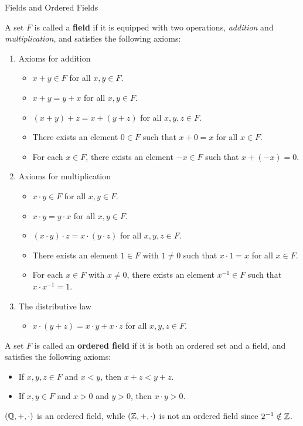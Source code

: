 \begin{section}{Fields and Ordered Fields}

A set $F$ is called a \textbf{field} if it is equipped with two operations,
\emph{addition} and \emph{multiplication}, and satisfies the following axioms:
\begin{enumerate}[label=\textbf{(\Alph*)}]
    \item Axioms for addition
    \begin{itemize}
        \item $x + y \in F$ for all $x, y \in F$.
        \item $x + y = y + x$ for all $x, y \in F$.
        \item $(x + y) + z = x + (y + z)$ for all $x, y, z \in F$.
        \item There exists an element $0 \in F$ such that $x + 0 = x$ for all $x \in F$.
        \item For each $x \in F$, there exists an element $-x \in F$ such that $x + (-x) = 0$.
    \end{itemize}
    \item Axioms for multiplication
    \begin{itemize}
        \item $x \cdot y \in F$ for all $x, y \in F$.
        \item $x \cdot y = y \cdot x$ for all $x, y \in F$.
        \item $(x \cdot y) \cdot z = x \cdot (y \cdot z)$ for all $x, y, z \in F$.
        \item There exists an element $1 \in F$ with $1 \neq 0$ such that $x \cdot 1 = x$ for all $x \in F$.
        \item For each $x \in F$ with $x \neq 0$, there exists an element $x^{-1} \in F$ such that $x \cdot x^{-1} = 1$.
    \end{itemize}
    \item The distributive law
    \begin{itemize}
        \item $x \cdot (y + z) = x \cdot y + x \cdot z$ for all $x, y, z \in F$.
    \end{itemize}
\end{enumerate}

A set $F$ is called an \textbf{ordered field} if it is both an ordered set and a field, and satisfies the following axioms:
\begin{itemize}
    \item If $x, y, z \in F$ and $x < y$, then $x + z < y + z$.
    \item If $x, y \in F$ and $x > 0$ and $y > 0$, then $x \cdot y > 0$.
\end{itemize}

\bigskip

\begin{example}
    $(\mathbb{Q}, +, \cdot)$ is an ordered field, while $(\mathbb{Z}, +, \cdot)$ is not an ordered field since $2^{-1} \notin \mathbb{Z}$.
\end{example}

\end{section}